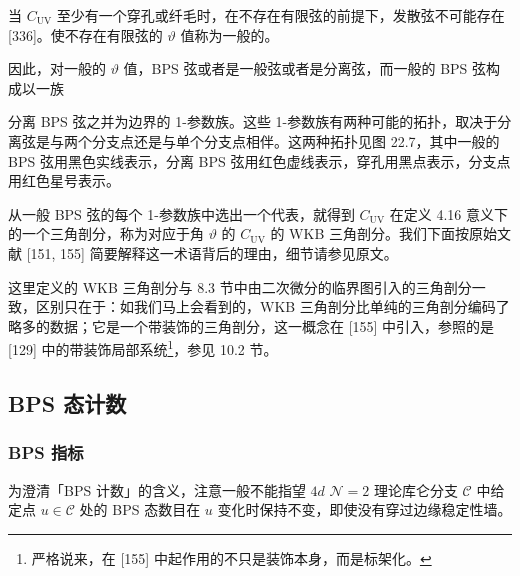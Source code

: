 \begin{remark}[22.8]
当 $C_{\mathrm{UV}}$ 至少有一个穿孔或纤毛时，在不存在有限弦的前提下，发散弦不可能存在 [336]。使不存在有限弦的 $\vartheta$ 值称为一般的。
\end{remark}

因此，对一般的 $\vartheta$ 值，BPS 弦或者是一般弦或者是分离弦，而一般的 BPS 弦构成以一族

分离 BPS 弦之并为边界的 1-参数族。这些 1-参数族有两种可能的拓扑，取决于分离弦是与两个分支点还是与单个分支点相伴。这两种拓扑见图 22.7，其中一般的 BPS 弦用黑色实线表示，分离 BPS 弦用红色虚线表示，穿孔用黑点表示，分支点用红色星号表示。


从一般 BPS 弦的每个 1-参数族中选出一个代表，就得到 $C_{\mathrm{UV}}$ 在定义 4.16 意义下的一个三角剖分，称为对应于角 $\vartheta$ 的 $C_{\mathrm{UV}}$ 的 WKB 三角剖分。我们下面按原始文献 [151, 155] 简要解释这一术语背后的理由，细节请参见原文。

\begin{remark}[22.9]
这里定义的 WKB 三角剖分与 8.3 节中由二次微分的临界图引入的三角剖分一致，区别只在于：如我们马上会看到的，WKB 三角剖分比单纯的三角剖分编码了略多的数据；它是一个带装饰的三角剖分，这一概念在 [155] 中引入，参照的是 [129] 中的带装饰局部系统\footnote{严格说来，在 [155] 中起作用的不只是装饰本身，而是标架化。}，参见 10.2 节。
\end{remark}

\subsection{BPS 态计数}

\subsubsection*{BPS 指标}

为澄清「BPS 计数」的含义，注意一般不能指望 $4d$ $\mathcal{N}=2$ 理论库仑分支 $\mathcal{C}$ 中给定点 $u\in\mathcal{C}$ 处的 BPS 态数目在 $u$ 变化时保持不变，即使没有穿过边缘稳定性墙。

